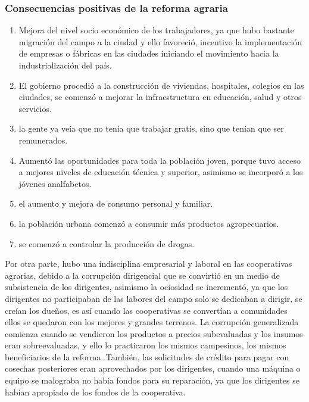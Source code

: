\documentclass[
  a4paper,
]{article}
\begin{document}
\hypertarget{consecuencias-positivas-de-la-reforma-agraria}{%
\subsubsection{Consecuencias positivas de la reforma
agraria}\label{consecuencias-positivas-de-la-reforma-agraria}}

\begin{enumerate}
\def\labelenumi{\arabic{enumi}.}
\item
  Mejora del nivel socio económico de los trabajadores, ya que hubo
  bastante migración del campo a la ciudad y ello favoreció, incentivo
  la implementación de empresas o fábricas en las ciudades iniciando el
  movimiento hacia la industrialización del país.
\item
  El gobierno procedió a la construcción de viviendas, hospitales,
  colegios en las ciudades, se comenzó a mejorar la infraestructura en
  educación, salud y otros servicios.
\item
  la gente ya veía que no tenía que trabajar gratis, sino que tenían que
  ser remunerados.
\item
  Aumentó las oportunidades para toda la población joven, porque tuvo
  acceso a mejores niveles de educación técnica y superior, asimismo se
  incorporó a los jóvenes analfabetos.
\item
  el aumento y mejora de consumo personal y familiar.
\item
  la población urbana comenzó a consumir más productos agropecuarios.
\item
  se comenzó a controlar la producción de drogas.
\end{enumerate}

Por otra parte, hubo una indisciplina empresarial y laboral en las
cooperativas agrarias, debido a la corrupción dirigencial que se
convirtió en un medio de subsistencia de los dirigentes, asimismo la
ociosidad se incrementó, ya que los dirigentes no participaban de las
labores del campo solo se dedicaban a dirigir, se creían los dueños, es
así cuando las cooperativas se convertían a comunidades ellos se
quedaron con los mejores y grandes terrenos. La corrupción generalizada
comienza cuando se vendieron los productos a precios subevaluadas y los
insumos eran sobreevaluadas, y ello lo practicaron los mismos
campesinos, los mismos beneficiarios de la reforma. También, las
solicitudes de crédito para pagar con cosechas posteriores eran
aprovechados por los dirigentes, cuando una máquina o equipo se
malograba no había fondos para su reparación, ya que los dirigentes se
habían apropiado de los fondos de la cooperativa.
\end{document}

